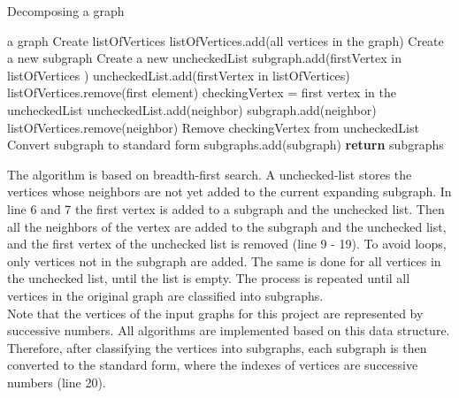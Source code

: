 \documentclass[a4paper]{report}
\begin{document}
		\begin{algorithm}
			\caption{Decomposing a graph}
			\label{alg:decompose}
			\begin{algorithmic}[1]
				\REQUIRE a graph
				\STATE Create listOfVertices 
				\STATE listOfVertices.add(all vertices in the graph)
				\STATE Create a new subgraph
				\STATE Create a new uncheckedList
				\STATE subgraph.add(firstVertex in listOfVertices )
				\STATE uncheckedList.add(firstVertex in listOfVertices)
				\STATE listOfVertices.remove(first element)
				\STATE checkingVertex = first vertex in the uncheckedList
				\STATE uncheckedList.add(neighbor)
				\STATE subgraph.add(neighbor)
				\ENDIF
				\STATE listOfVertices.remove(neighbor)
				\ENDFOR
				\STATE Remove checkingVertex from uncheckedList
				\ENDWHILE
				\STATE Convert subgraph to standard form
				\STATE subgraphs.add(subgraph)
				\ENDWHILE
				\STATE \textbf{return} subgraphs
				
			\end{algorithmic}
		\end{algorithm}
		The algorithm is based on breadth-first search. A unchecked-list stores the vertices whose neighbors are not yet added to the current expanding subgraph. In line 6 and 7 the first vertex is added to a subgraph and the unchecked list. Then all the neighbors of the vertex are added to the subgraph and the unchecked list, and the first vertex of the unchecked list is removed (line 9 - 19). To avoid loops, only vertices not in the subgraph are added. The same is done for all vertices in the unchecked list, until the list is empty. The process is repeated until all vertices in the original graph are classified into subgraphs.\\
		Note that the vertices of the input graphs for this project are represented by successive numbers. All algorithms are implemented based on this data structure. Therefore, after classifying the vertices into subgraphs, each subgraph is then converted to the standard form, where the indexes of vertices are successive numbers (line 20).
		
\end{document}
